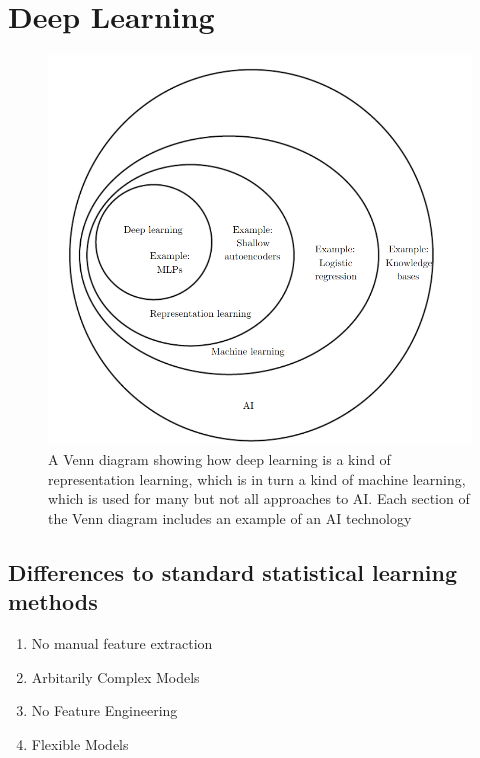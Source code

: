 \documentclass[../Main.tex]{subfiles}
\begin{document}
\chapter{Deep Learning}


\begin{figure}[H]
    \centering
    \includegraphics[width=0.75\linewidth]{Images/deepl-venn.png}
    \caption{A Venn diagram showing how deep learning is a kind of representation learning, which is in turn a kind of machine learning, 
    which is used for many but not all approaches to AI. Each section of the Venn diagram includes an example of an AI technology}
\end{figure}

\section{Differences to standard statistical learning methods}
\begin{enumerate}
    \item No manual feature extraction
    \item Arbitarily Complex Models
    \item No Feature Engineering
    \item Flexible Models
\end{enumerate}
\end{document}
